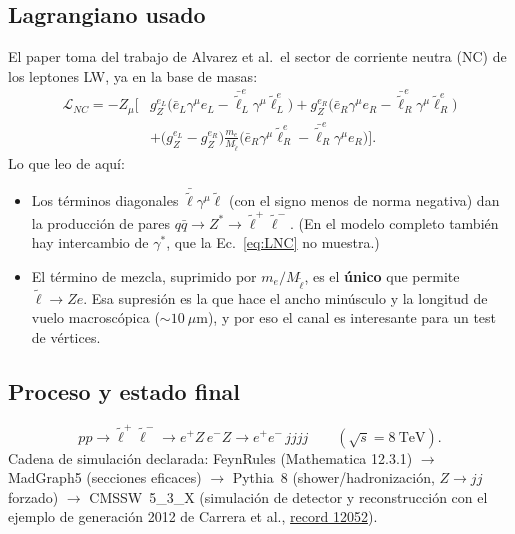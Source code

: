 \documentclass[11pt,a4paper]{article}
\newcommand{\lt}{\tilde{\ell}}
\begin{document}
\subsection{Lagrangiano usado}
El paper toma del trabajo de Alvarez et al.\ el sector de corriente neutra (NC) de los leptones LW, ya en la base de masas:
\begin{equation}
\begin{aligned}
\mathcal{L}_{NC}=-Z_\mu\Big[&g_Z^{e_L}\big(\bar e_L\gamma^\mu e_L-\bar{\lt}^{e}_{L}\gamma^\mu\lt^{e}_{L}\big)
+g_Z^{e_R}\big(\bar e_R\gamma^\mu e_R-\bar{\lt}^{e}_{R}\gamma^\mu\lt^{e}_{R}\big)\\
&+\big(g_Z^{e_L}-g_Z^{e_R}\big)\frac{m_e}{M_{\lt}}\big(\bar e_R\gamma^\mu\lt^{e}_{R}-\bar{\lt}^{e}_{R}\gamma^\mu e_R\big)\Big].
\end{aligned}
\label{eq:LNC}
\end{equation}
Lo que leo de aquí:
\begin{itemize}
\item Los términos diagonales $\bar\lt\gamma^\mu\lt$ (con el signo menos de norma negativa) dan la producción de pares $q\bar q\to Z^*\to\lt^+\lt^-$. (En el modelo completo también hay intercambio de $\gamma^*$, que la Ec.~\eqref{eq:LNC} no muestra.)
\item El término de mezcla, suprimido por $m_e/M_{\lt}$, es el \textbf{único} que permite $\lt\to Ze$. Esa supresión es la que hace el ancho minúsculo y la longitud de vuelo macroscópica ($\sim 10~\mu$m), y por eso el canal es interesante para un test de vértices.
\end{itemize}

\subsection{Proceso y estado final}
\[
pp\to\lt^{+}\lt^{-}\to e^{+}Z\,e^{-}Z\to e^{+}e^{-}\,jjjj\qquad(\sqrt s=8~\mathrm{TeV}).
\]
Cadena de simulación declarada: FeynRules (Mathematica 12.3.1) $\to$ MadGraph5 (secciones eficaces) $\to$ Pythia~8 (shower/hadronización, $Z\to jj$ forzado) $\to$ CMSSW~5\_3\_X (simulación de detector y reconstrucción con el ejemplo de generación 2012 de Carrera et al., \href{https://opendata.cern.ch/record/12052}{record 12052}).
\end{document}
